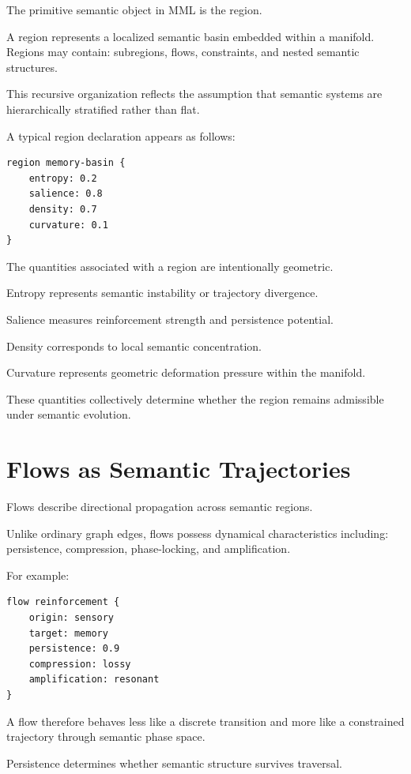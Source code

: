 \documentclass[11pt]{article}
\begin{document}
The primitive semantic object in MML is the region.

A region represents a localized semantic basin embedded within a manifold. Regions may contain:
subregions,
flows,
constraints,
and nested semantic structures.

This recursive organization reflects the assumption that semantic systems are hierarchically stratified rather than flat.

A typical region declaration appears as follows:

\begin{lstlisting}
region memory-basin {
    entropy: 0.2
    salience: 0.8
    density: 0.7
    curvature: 0.1
}
\end{lstlisting}

The quantities associated with a region are intentionally geometric.

Entropy represents semantic instability or trajectory divergence.

Salience measures reinforcement strength and persistence potential.

Density corresponds to local semantic concentration.

Curvature represents geometric deformation pressure within the manifold.

These quantities collectively determine whether the region remains admissible under semantic evolution.

\section{Flows as Semantic Trajectories}

Flows describe directional propagation across semantic regions.

Unlike ordinary graph edges, flows possess dynamical characteristics including:
persistence,
compression,
phase-locking,
and amplification.

For example:

\begin{lstlisting}
flow reinforcement {
    origin: sensory
    target: memory
    persistence: 0.9
    compression: lossy
    amplification: resonant
}
\end{lstlisting}

A flow therefore behaves less like a discrete transition and more like a constrained trajectory through semantic phase space.

Persistence determines whether semantic structure survives traversal.
\end{document}
